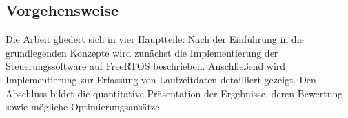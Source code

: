 \subsection{Vorgehensweise}

Die Arbeit gliedert sich in vier Hauptteile: Nach der Einführung in die
grundlegenden Konzepte wird zunächst die Implementierung der Steuerungssoftware
auf FreeRTOS beschrieben. Anschließend wird Implementierung zur Erfassung von
Laufzeitdaten detailliert gezeigt. Den Abschluss bildet die quantitative
Präsentation der Ergebnisse, deren Bewertung sowie mögliche Optimierungsansätze.
